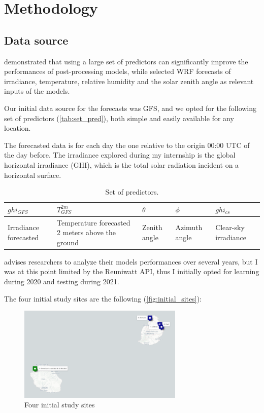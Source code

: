 \section{Methodology}
\label{sec:methodo}
\subsection{Data source}
\cite{verbois_statistical_2022} demonstrated that using a large set of predictors can significantly improve the performances of post-processing models, while \cite{suksamosorn_post-processing_2021}
selected WRF forecasts of irradiance, temperature, relative humidity and the solar zenith angle as relevant inputs of the models.

Our initial data source for the forecasts was GFS, and we opted for the following set of predictors (\autoref{tab:set_pred}), both simple and easily available for any location.

The forecasted data is for each day the one relative to the origin 00:00 UTC of the day before. The irradiance explored during my internship is the global horizontal irradiance (GHI), which is
the total solar radiation incident on a horizontal surface.

\begin{table}[h]
    \centering
    \begin{tabularx}{\textwidth} { 
  | >{\centering\arraybackslash}X 
  | >{\centering\arraybackslash}X 
  | >{\centering\arraybackslash}X 
  | >{\centering\arraybackslash}X
  | >{\centering\arraybackslash}X 
  |}
 \hline
 $ghi_{GFS}$ & $T_{GFS}^{2m}$ & $\theta$ & $\phi$ & $ghi_{cs}$ \\
 \hline
 \scriptsize Irradiance forecasted  & \scriptsize Temperature forecasted 2 meters above the ground & \scriptsize Zenith angle & \scriptsize Azimuth angle & \scriptsize Clear-sky irradiance \\
\hline
\end{tabularx}
    \caption{Set of predictors.}
    \label{tab:set_pred}
\end{table}

\cite{verbois_statistical_2022} advises researchers to analyze their models performances over several years, but I was at this point limited by the Reuniwatt API, thus
I initially opted for learning during 2020 and testing during 2021.

The four initial study sites are the following (\autoref{fig:initial_sites}):
\begin{figure}[htb!]
    \centering
    \includegraphics[width=0.7\textwidth]{figures/initial_study_sites.png}
    \caption{Four initial study sites}
    \label{fig:initial_sites}
\end{figure}
